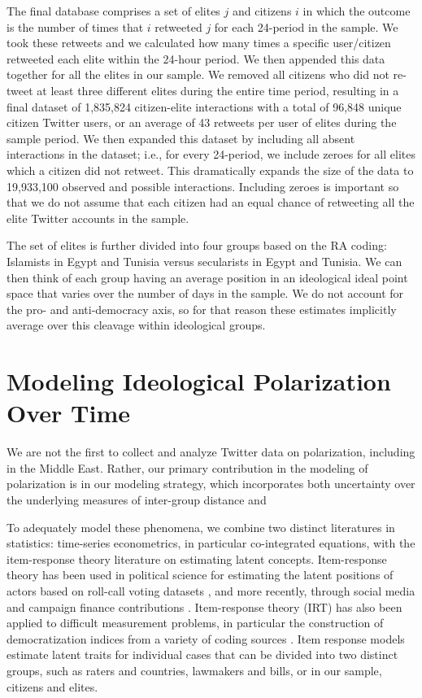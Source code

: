 \documentclass[12pt]{article}
\begin{document}
The final database comprises a set of elites $j$ and citizens $i$ in which the outcome is the number of times that $i$ retweeted $j$ for each 24-period in the sample. We took these retweets and we calculated how many times a specific user/citizen retweeted each elite within the 24-hour period. We then appended this data together for all the elites in our sample. We removed all citizens who did not re-tweet at least three different elites during the entire time period, resulting in a final dataset of 1,835,824 citizen-elite interactions with a total of 96,848 unique citizen Twitter users, or an average of 43 retweets per user of elites during the sample period. We then expanded this dataset by including all absent interactions in the dataset; i.e., for every 24-period, we include zeroes for all elites which a citizen did not retweet. This dramatically expands the size of the data to 19,933,100 observed and possible interactions. Including zeroes is important so that we do not assume that each citizen had an equal chance of retweeting all the elite Twitter accounts in the sample.

The set of elites is further divided into four groups based on the RA coding: Islamists in Egypt and Tunisia versus secularists in Egypt and Tunisia. We can then think of each group having an average position in an ideological ideal point space that varies over the number of days in the sample. We do not account for the pro- and anti-democracy axis, so for that reason these estimates implicitly average over this cleavage within ideological groups.

\section*{Modeling Ideological Polarization Over Time}

We are not the first to collect and analyze Twitter data on polarization, including in the Middle East. Rather, our primary contribution in the modeling of polarization is in our modeling strategy, which incorporates both uncertainty over the underlying measures of inter-group distance and 

To adequately model these phenomena, we combine two distinct literatures in statistics: time-series econometrics, in particular co-integrated equations, with the item-response theory literature on estimating latent concepts. Item-response theory has been used in political science for estimating the latent positions of actors based on roll-call voting datasets \parencite{jackman2004}, and more recently, through social media and campaign finance contributions \parencite{bonica2014,barbera2015}. Item-response theory (IRT) has also been applied to difficult measurement problems, in particular the construction of democratization indices from a variety of coding sources \parencite{vdem2017,treier2008}. Item response models estimate latent traits for individual cases that can be divided into two distinct groups, such as raters and countries, lawmakers and bills, or in our sample, citizens and elites. 
\end{document}
